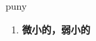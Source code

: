 
\begin{frame}
{\huge puny}
\begin{center}
\begin{enumerate}\Large
  \item \textbf{微小的，弱小的}
\end{enumerate}
\end{center}
\end{frame}
